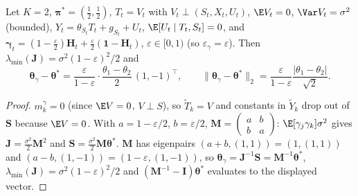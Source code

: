 \begin{proposition}
\label{prop:flip}
Let $K=2$, $\boldsymbol\pi^*=(\tfrac12,\tfrac12)$, $T_t=V_t$ with $V_t\perp(S_t,X_t,U_t)$, $\E V_t=0$, $\Var V_t=\sigma^2$ (bounded), $Y_t=\theta_{S_t}T_t+g_{S_t}+U_t$, $\E[U_t\mid T_t,S_t]=0$, and
$\boldsymbol\gamma_t=(1-\tfrac\varepsilon2)\boldsymbol H_t+\tfrac\varepsilon2(\boldsymbol 1-\boldsymbol H_t)$, $\varepsilon\in[0,1)$ (so $\varepsilon_\gamma=\varepsilon$). Then
$\lambda_{\min}(\boldsymbol J)=\sigma^2(1-\varepsilon)^2/2$ and
\[
\boldsymbol\theta_\gamma-\boldsymbol\theta^*=\frac{\varepsilon}{1-\varepsilon}\cdot\frac{\theta_1-\theta_2}{2}\,(1,-1)^\top,\qquad
\|\boldsymbol\theta_\gamma-\boldsymbol\theta^*\|_2=\frac{\varepsilon}{1-\varepsilon}\frac{|\theta_1-\theta_2|}{\sqrt2}.
\]
\end{proposition}
\begin{proof}
$m^\gamma_k=0$ (since $\E V=0$, $V\perp S$), so $\tilde T_k=V$ and constants in $\tilde Y_k$ drop out of $\boldsymbol S$ because $\E V=0$. With $a=1-\varepsilon/2$, $b=\varepsilon/2$, $\boldsymbol M=\left(\begin{smallmatrix}a&b\\b&a\end{smallmatrix}\right)$:
$\E[\gamma_j\gamma_k]\sigma^2$ gives $\boldsymbol J=\frac{\sigma^2}{2}\boldsymbol M^2$ and $\boldsymbol S=\frac{\sigma^2}{2}\boldsymbol M\boldsymbol\theta^*$.
$\boldsymbol M$ has eigenpairs $(a+b,(1,1))=(1,(1,1))$ and $(a-b,(1,-1))=(1-\varepsilon,(1,-1))$, so $\boldsymbol\theta_\gamma=\boldsymbol J^{-1}\boldsymbol S=\boldsymbol M^{-1}\boldsymbol\theta^*$, $\lambda_{\min}(\boldsymbol J)=\sigma^2(1-\varepsilon)^2/2$ and
$(\boldsymbol M^{-1}-\boldsymbol I)\boldsymbol\theta^*$ evaluates to the displayed vector.
\end{proof}
